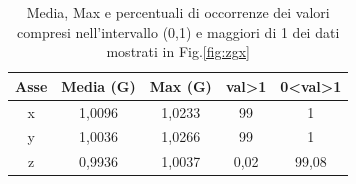\begin{table}[H]
	\centering
	\label{tab:zero-g}
	\begin{tabular}{|c|c|c|c|c|}
		\hline
		\textbf{Asse} & \multicolumn{1}{l|}{\textbf{Media (G)}} & \multicolumn{1}{l|}{\textbf{Max (G)}} & \textbf{ val>1} & \textbf{ 0<val>1} \\ \hline
			x             & 1,0096                                  & 1,0233                                & 99               & 1                  \\ \hline
			y             & 1,0036                                  & 1,0266                                & 99               & 1                  \\ \hline
			z             & 0,9936                                  & 1,0037                                & 0,02             & 99,08              \\ \hline
		\end{tabular}
	\caption{Media, Max e percentuali di occorrenze dei valori compresi nell'intervallo (0,1) e maggiori di 1 dei dati mostrati in Fig.\ref{fig:zgx} }
	\end{table}



